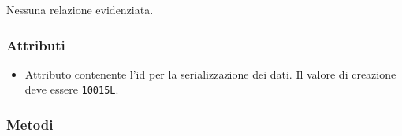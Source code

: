 Nessuna relazione evidenziata.

\subsubsection*{Attributi}

\begin{itemize}
	\item{}
	Attributo contenente l'id per la serializzazione dei dati. Il valore di creazione deve essere \texttt{10015L}.
\end{itemize}

\subsubsection*{Metodi}

